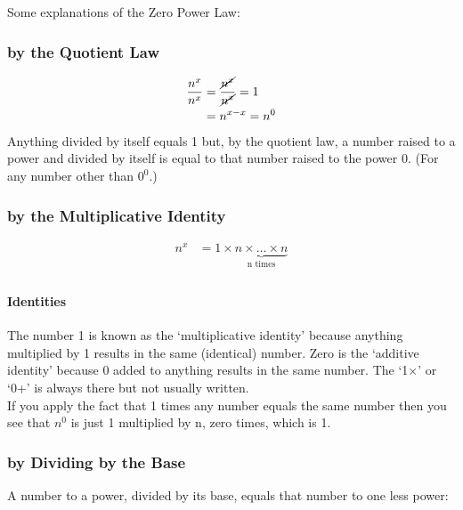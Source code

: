\documentclass{article}
\begin{document}
\vspace{32pt}
Some explanations of the Zero Power Law:
\\

\subsubsection*{by the Quotient Law}
\begin{align*}
\frac{n^x}{n^x}&=\frac{\cancel{n^x}}{\cancel{n^x}}  =1\\
&=n^{x-x}=n^0
\end{align*}
Anything divided by itself equals 1 but, by the quotient law, a number raised to a power and divided by itself is equal to that number raised to the power 0. (For any number other than $0^0$.)

\newpage

\subsubsection*{by the Multiplicative Identity}
\begin{large}
\begin{align*}
n^x&=1 \times \underbrace{n \times \ldots \times n}_{\text{n times}}\\
\end{align*}
\end{large}

\paragraph{Identities}
The number 1 is known as the ‘multiplicative identity’ because anything multiplied by 1 results in the same (identical) number. Zero is the ‘additive identity’ because 0 added to anything results in the same number. The ‘1×’ or ‘0+’ is always there but not usually written.\\

If you apply the fact that 1 times any number equals the same number then you see that $n^0$ is just 1 multiplied by n, zero times, which is 1.\\

\newpage

\subsubsection*{by Dividing by the Base}
A number to a power, divided by its base, equals that number to one less power:\\
\end{document}
